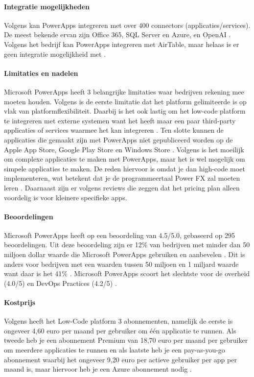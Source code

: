 \paragraph{Integratie mogelijkheden}
Volgens \textcite{Nguyen} kan PowerApps integreren met over 400 connectors (applicaties/services). De meest bekende
ervan zijn Office 365, SQL Server en Azure,  en OpenAI \autocite{Nguyen}. Volgens het bedrijf \textcite{Microsoft2024} kan PowerApps integreren met 
AirTable, maar helaas is er geen integratie mogelijkheid met \textcite{MAKE.com2024a}.
\paragraph*{Limitaties en nadelen}
Microsoft PowerApps heeft 3 belangrijke limitaties waar bedrijven rekening mee moeten houden. 
Volgens \textcite{Gupta2023} is de eerste limitatie dat het platform gelimiteerde is op vlak van platformflexibiliteit.
Daarbij is het ook lastig om het low-code platform te integreren met externe systemen want het heeft maar een paar 
third-party applicaties of services waarmee het kan integreren \autocite{Gupta2023}. Ten slotte kunnen de applicaties die gemaakt zijn met
PowerApps niet gepubliceerd worden op de Apple App Store, Google Play Store en Windows Store \autocite{Gupta2023}.
Volgens \textcite{Nguyen} is het moeilijk om complexe applicaties te maken met PowerApps, maar het is wel mogelijk om simpele applicaties te maken.
De reden hiervoor is omdat je dan high-code moet implementeren, wat betekent dat je de programmeertaal Power FX zal moeten leren \autocite{Nguyen}.
Daarnaast zijn er volgens \textcite{Nguyen} reviews die zeggen dat het pricing plan alleen voordelig is voor kleinere specifieke apps.
\paragraph{Beoordelingen}
Microsoft PowerApps heeft op \textcite{Gartner2024} een beoordeling van 4.5/5.0, gebaseerd op 295 beoordelingen.
Uit deze beoordeling zijn er 12\% van bedrijven met minder dan 50 miljoen dollar waarde die Microsoft PowerApps gebruiken en aanbevelen \autocite{Gartner2024}.
Dit is anders voor bedrijven met een waarden tussen 50 miljoen en 1 miljard waarde want daar is het 41\% \autocite{Gartner2024}.
Microsoft PowerApps scoort het slechtste voor de overheid (4.0/5) en DevOps Practices (4.2/5) \autocite{Gartner2024}.

\paragraph{Kostprijs}
Volgens \textcite{Gupta2023} heeft het Low-Code platform 3 abonnementen, namelijk de eerste is ongeveer 4,60 euro per maand per gebruiker om één applicatie te runnen.
Als tweede heb je een abonnement Premium van 18,70 euro per maand per gebruiker om meerdere applicaties te runnen en als laatste heb je een pay-as-you-go abonnement
waarbij het ongeveer 9,20 euro per actieve gebruiker per app per maand is, maar hiervoor heb je een Azure abonnement nodig \autocite{Gupta2023}.
